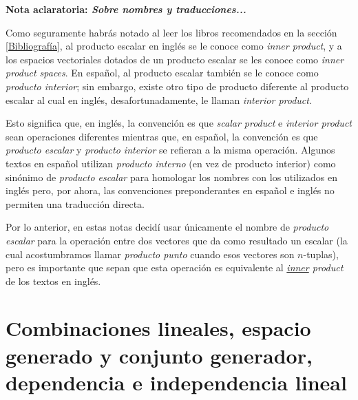 \documentclass[12pt]{article}
\begin{document}
\vspace{5cm}

\begin{tcolorbox}
\begin{center}
    \textbf{Nota aclaratoria: \emph{Sobre nombres y traducciones...}}
\end{center}

\hspace{2.5mm}Como seguramente habrás notado al leer los libros recomendados en la sección \ref{Bibliografía}, al producto escalar en inglés se le conoce como \emph{inner product}, y a los espacios vectoriales dotados de un producto escalar se les conoce como \emph{inner product spaces}. En español, al producto escalar también se le conoce como \emph{producto interior}; sin embargo, existe otro tipo de producto diferente al producto escalar al cual en inglés, desafortunadamente, le llaman \emph{interior product}.

\hspace{2.5mm}Esto significa que, en inglés, la convención es que \emph{scalar product} e \emph{interior product} sean operaciones diferentes mientras que, en español, la convención es que \emph{producto escalar} y \emph{producto interior} se refieran a la misma operación. Algunos textos en español utilizan \emph{producto interno} (en vez de producto interior) como sinónimo de \emph{producto escalar} para homologar los nombres con los utilizados en inglés pero, por ahora, las convenciones preponderantes en español e inglés no permiten una traducción directa.

\hspace{2.5mm}Por lo anterior, en estas notas decidí usar únicamente el nombre de \emph{producto escalar} para la operación entre dos vectores que da como resultado un escalar (la cual acostumbramos llamar \emph{producto punto} cuando esos vectores son $n$-tuplas), pero es importante que sepan que esta operación es equivalente al \emph{\underline{inner} product} de los textos en inglés.
\end{tcolorbox}




\newpage
\section{Combinaciones lineales, espacio generado y conjunto generador, dependencia e independencia lineal}
\end{document}
